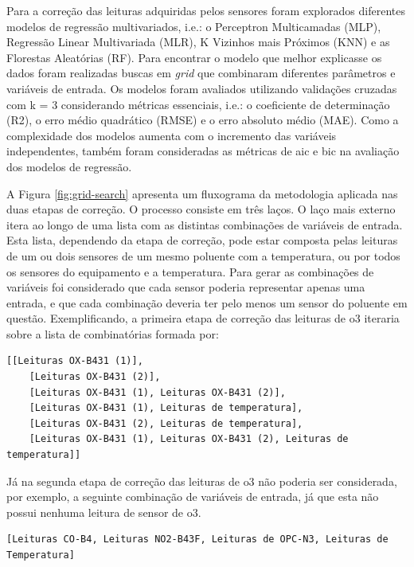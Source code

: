 Para a correção das leituras adquiridas pelos sensores foram explorados diferentes modelos de regressão multivariados, i.e.: o Perceptron Multicamadas (MLP), Regressão Linear Multivariada (MLR), K Vizinhos mais Próximos (KNN) e as Florestas Aleatórias (RF). Para encontrar o modelo que melhor explicasse os dados foram realizadas buscas em \textit{grid} que combinaram diferentes parâmetros e variáveis de entrada. Os modelos foram avaliados utilizando validações cruzadas com k = 3 considerando métricas essenciais, i.e.: o coeficiente de determinação (R2), o erro médio quadrático (RMSE) e o erro absoluto médio (MAE). Como a complexidade dos modelos aumenta com o incremento das variáveis independentes, também foram consideradas as métricas de \acrshort{aic} e \acrshort{bic} na avaliação dos modelos de regressão.

A Figura \ref{fig:grid-search} apresenta um fluxograma da metodologia aplicada nas duas etapas de correção. O processo consiste em três laços. O laço mais externo itera ao longo de uma lista com as distintas combinações de variáveis de entrada. Esta lista, dependendo da etapa de correção, pode estar composta pelas leituras de um ou dois sensores de um mesmo poluente com a temperatura, ou por todos os sensores do equipamento e a temperatura. Para gerar as combinações de variáveis foi considerado que cada sensor poderia representar apenas uma entrada, e que cada combinação deveria ter pelo menos um sensor do poluente em questão. Exemplificando, a primeira etapa de correção das leituras de \acrshort{o3} iteraria sobre a lista de combinatórias formada por: 

\begin{lstlisting}[basicstyle=\tiny]
    [[Leituras OX-B431 (1)], 
    [Leituras OX-B431 (2)], 
    [Leituras OX-B431 (1), Leituras OX-B431 (2)],
    [Leituras OX-B431 (1), Leituras de temperatura],
    [Leituras OX-B431 (2), Leituras de temperatura],
    [Leituras OX-B431 (1), Leituras OX-B431 (2), Leituras de temperatura]] 
\end{lstlisting}

Já na segunda etapa de correção das leituras de \acrshort{o3} não poderia ser considerada, por exemplo, a seguinte combinação de variáveis de entrada, já que esta não possui nenhuma leitura de sensor de \acrshort{o3}.

\begin{lstlisting}[basicstyle=\tiny]
    [Leituras CO-B4, Leituras NO2-B43F, Leituras de OPC-N3, Leituras de Temperatura]
\end{lstlisting}

